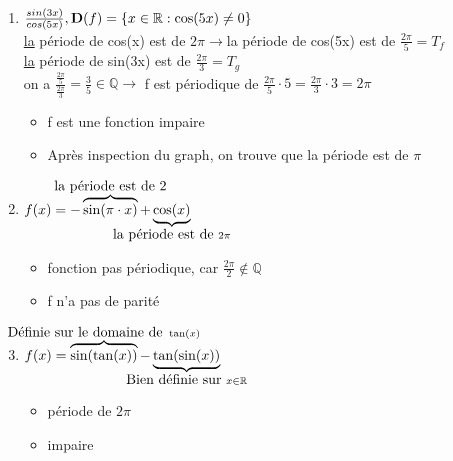 \documentclass[12pt,a4paper]{article}
\begin{document}
{\begin{enumerate}
\item $\frac{sin(3x)}{cos(5x)}, \mathbf{D}(f)=\{x \in \mathbb{R} : \cos(5x) \neq 0\} $\\
	\underline{la} période de cos(x) est de $2\pi \to $la période de cos(5x) est de $\frac{2\pi}{5} = T_f$\\
		\underline{la} période de sin(3x) est de $\frac{2\pi}{3} = T_g$\\
		on a $\frac{\frac{2\pi}{5}}{\frac{2\pi}{3}} = \frac{3}{5} \in \mathbb{Q} \to$ f est périodique de $\frac{2\pi}{5}\cdot 5 = \frac{2\pi}{3} \cdot 3 = 2\pi$
		\begin{itemize}
			\item f est une fonction impaire
			\item Après inspection du graph, on trouve que la période est de $\pi$
		\end{itemize}
		
	\item $f(x) = -\overbrace{\sin(\pi \cdot x)}^{\mathclap{\mbox{la période est de 2}}}+\underbrace{\cos(x)}_{\mathclap{\mbox{la période est de }2\pi}}$
		\begin{itemize}
			\item fonction pas périodique, car $\frac{2\pi}{2} \not \in \mathbb{Q}$
			\item f n'a pas de parité
		\end{itemize}
	\item $f(x) = \overbrace{\sin(\tan(x))}^{\mathclap{\mbox{Définie sur le domaine de } \tan(x)}}-\underbrace{\tan(\sin(x))}_{\mathclap{\mbox{Bien définie sur }x\in \R}}$
		\begin{itemize}
			\item période de $2\pi$
			\item impaire
		\end{itemize}
\end{enumerate}

}
\end{document}
